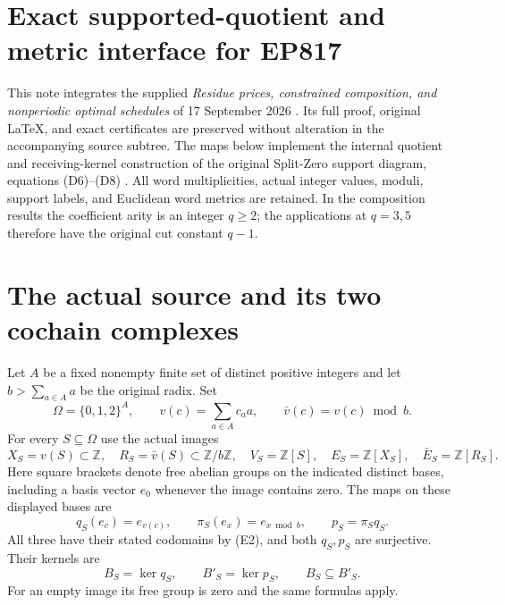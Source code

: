 \endgroup

\clearpage
\begingroup
\def\Z{\mathbb Z}
\def\C{\mathbb C}
\def\R{\mathbb R}

\setcounter{equation}{0}
\renewcommand{\theequation}{EP.\arabic{equation}}
\section*{Exact supported-quotient and metric interface for EP817}



This note integrates the supplied \emph{Residue prices, constrained composition,
and nonperiodic optimal schedules} of 17 September 2026
\cite{ep:continuation}.  Its full proof, original LaTeX, and exact certificates
are preserved without alteration in the accompanying source subtree.
The maps below implement the internal quotient and receiving-kernel construction
of the original Split-Zero support diagram, equations (D6)--(D8)
\cite{ep:support}.  All word multiplicities, actual integer values, moduli,
support labels, and Euclidean word metrics are retained.  In the
composition results the coefficient arity is an integer \(q\geq2\);
the applications at \(q=3,5\) therefore have the original cut constant \(q-1\).

\section{The actual source and its two cochain complexes}

Let \(A\) be a fixed nonempty finite set of distinct positive integers and
let \(b>\sum_{a\in A}a\) be the original radix.  Set
\[
 \Omega=\{0,1,2\}^{A},\qquad
 v(c)=\sum_{a\in A}c_a a,\qquad
 \bar v(c)=v(c)\bmod b .
 \tag{E1}
\]
For every \(S\subseteq\Omega\) use the actual images
\[
 X_S=v(S)\subset\Z,\quad R_S=\bar v(S)\subset\Z/b\Z,\quad
 V_S=\Z[S],\quad E_S=\Z[X_S],\quad \bar E_S=\Z[R_S].
 \tag{E2}
\]
Here square brackets denote free abelian groups on the indicated distinct
bases, including a basis vector \(e_0\) whenever the image contains zero.
The maps on these displayed bases are
\[
 q_S(e_c)=e_{v(c)},\qquad
 \pi_S(e_x)=e_{x\bmod b},\qquad p_S=\pi_Sq_S.
 \tag{E3}
\]
All three have their stated codomains by (E2), and both \(q_S,p_S\) are
surjective.  Their kernels are
\[
 B_S=\ker q_S,\qquad B'_S=\ker p_S,\qquad B_S\subseteq B'_S .
 \tag{E4}
\]
For an empty image its free group is zero and the same formulas apply.

